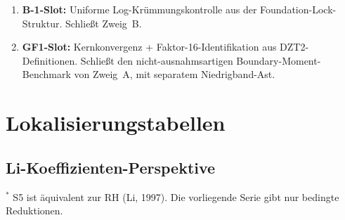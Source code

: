 \documentclass[12pt,a4paper]{article}
\theoremstyle{definition}
\theoremstyle{remark}
\begin{document}
\begin{enumerate}
  \item \textbf{B-1-Slot:} Uniforme Log-Krümmungskontrolle aus der
    Foundation-Lock-Struktur. Schließt Zweig~B.
  \item \textbf{GF1-Slot:} Kernkonvergenz + Faktor-16-Identifikation
    aus DZT2-Definitionen. Schließt den nicht-ausnahmsartigen
    Boundary-Moment-Benchmark von Zweig~A, mit separatem Niedrigband-Ast.
\end{enumerate}


\section{Lokalisierungstabellen}
\label{sec:localization}

\subsection{Li-Koeffizienten-Perspektive}

\begin{center}
\renewcommand{\arraystretch}{1.2}
\end{center}

{\footnotesize\noindent${}^{\ast}$ S5 ist äquivalent zur RH (Li, 1997).
Die vorliegende Serie gibt nur bedingte Reduktionen.\par}
\end{document}
